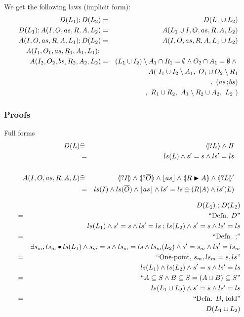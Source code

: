 We get the following laws (implicit form):
\begin{eqnarray*}
   D(L_1) ; D(L_2) &=& D(L_1 \cup L_2)
%
\\ D(L_1) ;  A(I,O,as,R,A,L_2)
   &=&
   A(L_1\cup I,O,as,R,A,L_2)
%
\\  A(I,O,as,R,A,L_1) ; D(L_2)
   &=&
   A(I,O,as,R,A,L_1\cup L_2)
%
\\ A(I_1,O_1,as,R_1,A_1,L_1) ; {}
\\ A(I_2,O_2,bs,R_2,A_2,L_2)
   &=&  (L_1 \cup I_2)\setminus A_1 \cap R_1 = \emptyset
        \land O_2 \cap A_1 = \emptyset \land {}
\\&& A(~   I_1 \cup I_2\setminus A_1
      ,~   O_1 \cup O_2\setminus R_1
\\&& ~~~,~ (as\!\seq\! bs)
\\&& ~~~,~ R_1 \cup R_2
      ,~   A_1\setminus R_2 \cup A_2
      ,~   L_2 ~)
\end{eqnarray*}

\subsubsection{Proofs}

Full forms
\begin{eqnarray*}
   D(L)
   &\defs& \LS{L} \land \Skip
\\ &  =  & ls(L) \land s'=s \land ls'=ls
\\
\\ A(I,O,as,R,A,L)
   &\defs&
   \LS{I} \land \LS{\B O} \land \ado{as} \land \LUPD{R}{A} \land \LSd{L}
\\ &  =  & ls(I) \land ls(\B O) \land \ado{as} \land \lupd R A \land ls'(L)
\end{eqnarray*}

\begin{eqnarray*}
  && D(L_1) \mathrel{;} D(L_2)
\\&=&\textrm{``Defn. $D$''}
\\&& ls(L_1) \land s'=s \land ls'=ls \mathrel{;} ls(L_2) \land s'=s \land ls'=ls
\\&=&\textrm{``Defn. $\mathrel{;}$''}
\\&& \exists s_m,ls_m \bullet
    ls(L_1) \land s_m=s \land ls_m=ls
    \land ls_m(L_2) \land s'=s_m \land ls'=ls_m
\\&=&\textrm{``One-point, $s_m,ls_m = s,ls$''}
\\&& ls(L_1) \land ls(L_2) \land s'=s \land ls'=ls
\\&=&\textrm{``$A \subseteq S \land B \subseteq S = (A \cup B) \subseteq S$''}
\\&& ls(L_1 \cup L_2) \land s'=s \land ls'=ls
\\&=&\textrm{``Defn. $D$, fold''}
\\&& D(L_1 \cup L_2)
\end{eqnarray*}


